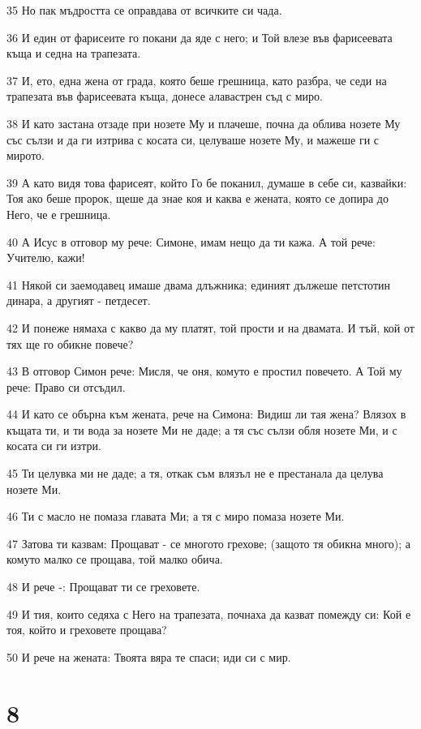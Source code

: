 \par 35 Но пак мъдростта се оправдава от всичките си чада.
\par 36 И един от фарисеите го покани да яде с него; и Той влезе във фарисеевата къща и седна на трапезата.
\par 37 И, ето, една жена от града, която беше грешница, като разбра, че седи на трапезата във фарисеевата къща, донесе алавастрен съд с миро.
\par 38 И като застана отзаде при нозете Му и плачеше, почна да облива нозете Му със сълзи и да ги изтрива с косата си, целуваше нозете Му, и мажеше ги с мирото.
\par 39 А като видя това фарисеят, който Го бе поканил, думаше в себе си, казвайки: Тоя ако беше пророк, щеше да знае коя и каква е жената, която се допира до Него, че е грешница.
\par 40 А Исус в отговор му рече: Симоне, имам нещо да ти кажа. А той рече: Учителю, кажи!
\par 41 Някой си заемодавец имаше двама длъжника; единият дължеше петстотин динара, а другият - петдесет.
\par 42 И понеже нямаха с какво да му платят, той прости и на двамата. И тъй, кой от тях ще го обикне повече?
\par 43 В отговор Симон рече: Мисля, че оня, комуто е простил повечето. А Той му рече: Право си отсъдил.
\par 44 И като се обърна към жената, рече на Симона: Видиш ли тая жена? Влязох в къщата ти, и ти вода за нозете Ми не даде; а тя със сълзи обля нозете Ми, и с косата си ги изтри.
\par 45 Ти целувка ми не даде; а тя, откак съм влязъл не е престанала да целува нозете Ми.
\par 46 Ти с масло не помаза главата Ми; а тя с миро помаза нозете Ми.
\par 47 Затова ти казвам: Прощават - се многото грехове; (защото тя обикна много); а комуто малко се прощава, той малко обича.
\par 48 И рече -: Прощават ти се греховете.
\par 49 И тия, които седяха с Него на трапезата, почнаха да казват помежду си: Кой е тоя, който и греховете прощава?
\par 50 И рече на жената: Твоята вяра те спаси; иди си с мир.

\chapter{8}

